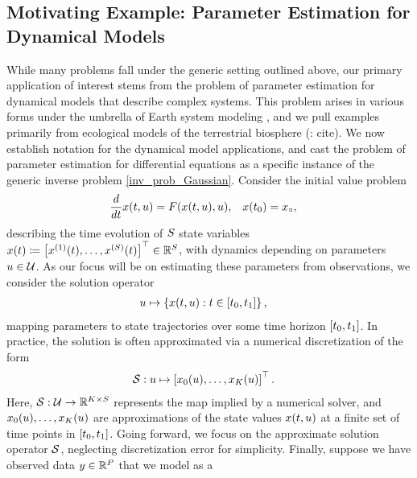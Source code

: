 \documentclass[12pt]{article}
\begin{document}
\subsection{Motivating Example: Parameter Estimation for Dynamical Models} \label{dynamical_models}
While many problems fall under the generic setting outlined above, our primary application of interest 
stems from the problem of parameter estimation for dynamical models that describe complex systems. 
This problem arises in various forms under the umbrella of Earth system modeling \citep{ESM_modeling_2pt0}, 
and we pull examples primarily from ecological models of the terrestrial biosphere (\todo: cite). We now 
establish notation for the dynamical model applications, and cast the problem of parameter estimation for 
differential equations as a specific instance of the generic inverse problem \ref{inv_prob_Gaussian}. 
Consider the initial value problem 
\begin{align}
\frac{d}{d\Time} \state(\Time, \Par) &= \odeRHS(\state(\Time, \Par), \Par), &&x(\timeStart) = \stateIC, \label{ode_ivp}
\end{align}
describing the time evolution of $\dimState$ state variables 
$\state(\Time) \Def \left[\indexState[1]{\state}(\Time), \dots, \indexState[\dimState]{\state}(\Time)\right]^\top \in \mathbb{R}^{\dimState}$,
with dynamics depending on parameters $\Par \in \parSpace$. As our focus will be on estimating these parameters 
from observations, we consider the solution operator 
\begin{align}
\Par &\mapsto \left\{\state(\Time, \Par) :  \Time \in [\timeStart, \timeEnd] \right\}, 
\end{align}
mapping parameters to state trajectories over some time horizon $[\timeStart, \timeEnd]$. In practice, the solution 
is often approximated via a numerical discretization of the form 
\begin{align}
\solutionOp: \Par &\mapsto \left[\indexTime[0]{\state}(\Par), \dots, \indexTime[\NTimeStep]{\state}(\Par) \right]^\top. 
\end{align}
Here, $\solutionOp: \parSpace \to \R^{\NTimeStep \times \dimState}$ represents the map implied by a numerical solver, 
and $\indexTime[0]{\state}(\Par), \dots, \indexTime[\NTimeStep]{\state}(\Par)$ are approximations of the state 
values $\state(\Time, \Par)$ at a finite set of time points in $[\timeStart, \timeEnd]$. 
Going forward, we focus on the approximate solution operator $\solutionOp$, neglecting discretization error 
for simplicity. Finally, suppose we have observed data $\obs \in \R^{\dimObs}$ that we model as a
\end{document}
